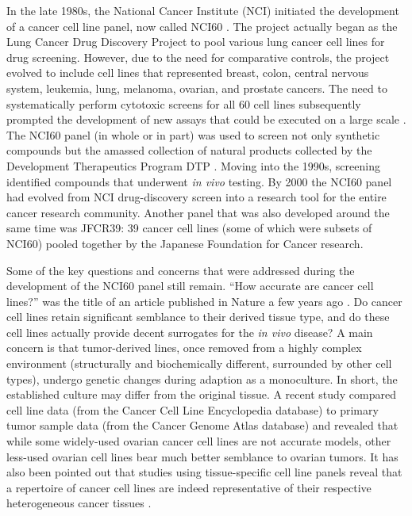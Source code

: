 \documentclass[12pt]{article}
\begin{document}
In the late 1980s, the National Cancer Institute (NCI) initiated the development of a cancer cell line panel, now called NCI60 \cite{Shoemaker2006}. The project actually began as the Lung Cancer Drug Discovery Project to pool various lung cancer cell lines for drug screening. However, due to the need for comparative controls, the project evolved to include cell lines that represented breast, colon, central nervous system, leukemia, lung, melanoma, ovarian, and prostate cancers. The need to systematically perform cytotoxic screens for all 60 cell lines subsequently prompted the development of new assays that could be executed on a large scale \cite{Shoemaker2006}. The NCI60 panel (in whole or in part) was used to screen not only synthetic compounds but the amassed collection of natural products collected by the Development Therapeutics Program DTP \cite{Shoemaker2006}. Moving into the 1990s, screening identified compounds that underwent \textit{in vivo} testing. By 2000 the NCI60 panel had evolved from NCI drug-discovery screen into a research tool for the entire cancer research community. Another panel that was also developed around the same time was JFCR39: 39 cancer cell lines (some of which were subsets of NCI60) pooled together by the Japanese Foundation for Cancer research.

Some of the key questions and concerns that were addressed during the development of the NCI60 panel still remain. \textquotedblleft How accurate are cancer cell lines?\textquotedblright \: was the title of an article published in Nature a few years ago \cite{Borrell2010}. Do cancer cell lines retain significant semblance to their derived tissue type, and do these cell lines actually provide decent surrogates for the \textit{in vivo} disease? A main concern is that tumor-derived lines, once removed from a highly complex environment (structurally and biochemically different, surrounded by other cell types), undergo genetic changes during adaption as a monoculture. In short, the established culture may differ from the original tissue. A recent study \cite{Domcke2013} compared cell line data (from the Cancer Cell Line Encyclopedia database) to primary tumor sample data (from the Cancer Genome Atlas database) and revealed that while some widely-used ovarian cancer cell lines are not accurate models, other less-used ovarian cell lines bear much better semblance to ovarian tumors. It has also been pointed out \cite{Sharma2010} that studies using tissue-specific cell line panels reveal that a repertoire of cancer cell lines are indeed representative of their respective heterogeneous cancer tissues \cite{Neve2006,Sos2009,Lin2008}. 
\end{document}
